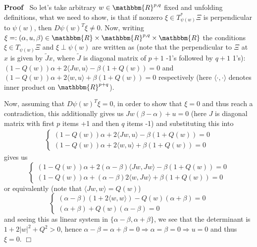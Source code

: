 \documentclass{article}
\renewenvironment{proof}{\noindent\textbf{Proof\ }}{\hspace*{\fill}$\Box$\medskip}
\theoremstyle{remark}
\begin{document}
\begin{proof}
  So let's take arbitrary $w \in \mathbbm{R}^{p, q}$ fixed and unfolding
  definitions, what we need to show, is that if nonzero $\xi \in T_{\psi
  (w)}^{\ast} \Xi$ is perpendicular to $\psi (w)$, then $D \psi (w)^T \xi \neq
  0$. Now, writing $\xi = : (\alpha, u, \beta) \in \mathbbm{R} \times
  \mathbbm{R}^{p, q} \times \mathbbm{R}$ the conditions $\xi \in T_{\psi (w)}
  \Xi$ and $\xi \perp \psi (w)$ are written as (note that the perpendicular to
  $\Xi$ at $x$ is given by $\tilde{J} x$, where $\tilde{J}$ is diagonal matrix
  of $p + 1$ -1's followed by $q + 1$ 1's): $(1 - Q (w)) \alpha + 2 \langle J
  w, u \rangle - \beta (1 + Q (w)) = 0$ and $(1 - Q (w)) \alpha + 2 \langle w,
  u \rangle + \beta (1 + Q (w)) = 0$ respectively (here $\langle \cdot, \cdot
  \rangle$ denotes inner product on $\mathbbm{R}^{p + q}$).
  
  Now, assuming that $D \psi (w)^T \xi = 0$, in order to show that $\xi = 0$
  and thus reach a contradiction, this additionally gives us $J w (\beta -
  \alpha) + u = 0$ (here $J$ is diagonal matrix with first $p$ items +1 and
  then $q$ items -1) and substituting this into
  \begin{eqnarray}
    & \left\{ \begin{array}{l}
      (1 - Q (w)) \alpha + 2 \langle J w, u \rangle - \beta (1 + Q (w)) = 0\\
      (1 - Q (w)) \alpha + 2 \langle w, u \rangle + \beta (1 + Q (w)) = 0
    \end{array} \right. &  \nonumber
  \end{eqnarray}
  gives us
  \[ \left\{ \begin{array}{l}
       (1 - Q (w)) \alpha + 2 (\alpha - \beta) \langle J w, J w \rangle -
       \beta (1 + Q (w)) = 0\\
       (1 - Q (w)) \alpha + (\alpha - \beta) 2 \langle w, J w \rangle + \beta
       (1 + Q (w)) = 0
     \end{array} \right. \]
  or equivalently (note that $\langle J w, w \rangle = Q (w)$)
  \[ \left\{ \begin{array}{l}
       (\alpha - \beta) (1 + 2 \langle w, w \rangle) - Q (w) (\alpha + \beta)
       = 0\\
       (\alpha + \beta) + Q (w) (\alpha - \beta) = 0
     \end{array} \right. \]
  and seeing this as linear system in $\{ \alpha - \beta, \alpha + \beta \}$,
  we see that the determinant is $1 + 2 | w |^2 + Q^2 > 0$, hence $\alpha -
  \beta = \alpha + \beta = 0 \Rightarrow \alpha = \beta = 0 \Rightarrow u = 0$
  and thus $\xi = 0$.
\end{proof}
\end{document}
